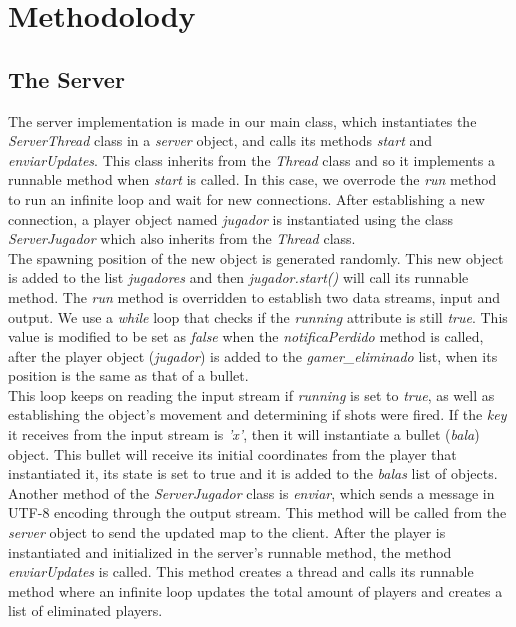 \documentclass[10pt,a4paper]{article}
\theoremstyle{definition}
\begin{document}
\section{Methodolody}
\subsection{The Server}
The server implementation is made in our main class, which instantiates the \textit{ServerThread} class in a \textit{server} object, and calls its methods \textit{start} and \textit{enviarUpdates}. 
This class inherits from the \textit{Thread} class and so it implements a runnable method when \textit{start} is called. 
In this case, we overrode the \textit{run} method to run an infinite loop and wait for new connections. 
After establishing a new connection, a player object named \textit{jugador} is instantiated using the class \textit{ServerJugador} which also inherits from the \textit{Thread} class. \\
The spawning position of the new object is generated randomly. 
This new object is added to the list \textit{jugadores} and then \textit{jugador.start()} will call its runnable method. 
The \textit{run} method is overridden to establish two data streams, input and output. 
We use a \textit{while} loop that checks if the \textit{running} attribute is still \textit{true}. 
This value is modified to be set as \textit{false} when the \textit{notificaPerdido} method is called, after the player object (\textit{jugador}) is added to the \textit{gamer\_eliminado} list, when its position is the same as that of a bullet. \\
This loop keeps on reading the input stream if \textit{running} is set to \textit{true}, as well as establishing the object's movement and determining if shots were fired. 
If the \textit{key} it receives from the input stream is \textit{'x'}, then it will instantiate a bullet (\textit{bala}) object. 
This bullet will receive its initial coordinates from the player that instantiated it, its state is set to true and it is added to the \textit{balas} list of objects. \\
Another method of the \textit{ServerJugador} class is \textit{enviar}, which sends a message in UTF-8 encoding through the output stream. 
This method will be called from the \textit{server} object to send the updated map to the client. 
After the player is instantiated and initialized in the server's runnable method, the method \textit{enviarUpdates} is called. 
This method creates a thread and calls its runnable method where an infinite loop updates the total amount of players and creates a list of eliminated players. 
\end{document}
